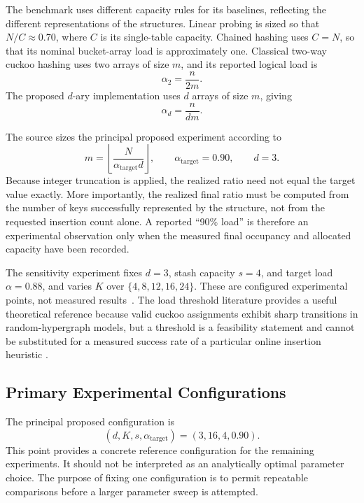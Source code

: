 \documentclass[conference]{IEEEtran}
\begin{document}
The benchmark uses different capacity rules for its baselines, reflecting the
different representations of the structures. Linear probing is sized so that
$N/C\approx0.70$, where $C$ is its single-table capacity. Chained hashing uses
$C=N$, so that its nominal bucket-array load is approximately one. Classical
two-way cuckoo hashing uses two arrays of size $m$, and its reported logical
load is
\begin{equation}
    \alpha_{2}=\frac{n}{2m}.
    \label{eq:alpha-two-way}
\end{equation}
The proposed $d$-ary implementation uses $d$ arrays of size $m$, giving
\begin{equation}
    \alpha_{d}=\frac{n}{dm}.
    \label{eq:alpha-d-way}
\end{equation}

The source sizes the principal proposed experiment according to
\begin{equation}
    m=\left\lfloor\frac{N}{\alpha_{\mathrm{target}}d}\right\rfloor,
    \qquad
    \alpha_{\mathrm{target}}=0.90,
    \qquad d=3.
    \label{eq:capacity-sizing}
\end{equation}
Because integer truncation is applied, the realized ratio need not equal the
target value exactly. More importantly, the realized final ratio must be
computed from the number of keys successfully represented by the structure,
not from the requested insertion count alone. A reported ``90\% load'' is
therefore an experimental observation only when the measured final occupancy
and allocated capacity have been recorded.

The sensitivity experiment fixes $d=3$, stash capacity $s=4$, and target load
$\alpha=0.88$, and varies $K$ over $\{4,8,12,16,24\}$. These are configured
experimental points, not measured results~\cite{walzer2022insertion,bell2024constant}.
The load threshold literature provides a useful theoretical reference because
valid cuckoo assignments exhibit sharp transitions in random-hypergraph models,
but a threshold is a feasibility statement and cannot be substituted for a
measured success rate of a particular online insertion heuristic
\cite{fountoulakis2012sharp,dietzfelbinger2009tight}.

\subsection{Primary Experimental Configurations}

The principal proposed configuration is
\begin{equation}
    (d,K,s,\alpha_{\mathrm{target}})=(3,16,4,0.90).
    \label{eq:principal-config}
\end{equation}
This point provides a concrete reference configuration for the remaining
experiments. It should not be interpreted as an analytically optimal parameter
choice. The purpose of fixing one configuration is to permit repeatable
comparisons before a larger parameter sweep is attempted.
\end{document}
